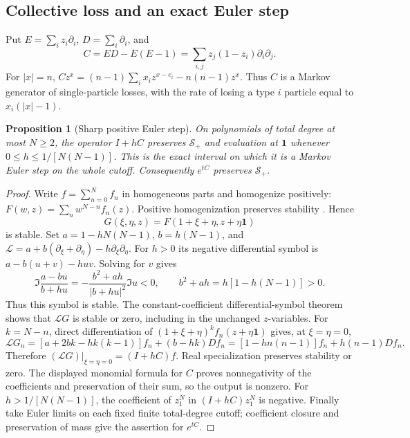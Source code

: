 \documentclass[reqno]{amsart}
\newtheorem{proposition}[theorem]{Proposition}
\theoremstyle{definition}
\theoremstyle{remark}
\begin{document}
\subsection{Collective loss and an exact Euler step}

Put \(E=\sum_i z_i\partial_i\), \(D=\sum_i\partial_i\), and
\begin{equation}\label{pos:coal-operator}
 C=ED-E(E-1)=\sum_{i,j}z_j(1-z_i)\partial_i\partial_j.
\end{equation}
For \(|x|=n\),
\(Cz^x=(n-1)\sum_i x_i z^{x-e_i}-n(n-1)z^x\).
Thus \(C\) is a Markov generator of single-particle losses, with the rate of losing
a type \(i\) particle equal to \(x_i(|x|-1)\).

\begin{proposition}[Sharp positive Euler step]\label{pos:coal}
On polynomials of total degree at most \(N\ge2\), the operator \(I+hC\) preserves
\(\mathcal S_+\) and evaluation at \(\boldsymbol1\) whenever
\(0\le h\le1/[N(N-1)]\).  This is the exact interval on which it is a Markov Euler
step on the whole cutoff.  Consequently \(e^{tC}\) preserves \(\mathcal S_+\).
\end{proposition}
\begin{proof}
Write \(f=\sum_{n=0}^Nf_n\) in homogeneous parts and homogenize positively:
\(F(w,z)=\sum_nw^{N-n}f_n(z)\).  Positive homogenization preserves stability
\cite[Theorem 4.5]{BBL09}.  Hence
\[
 G(\xi,\eta,z)=F(1+\xi+\eta,z+\eta\boldsymbol1)
\]
is stable.  Set \(a=1-hN(N-1)\), \(b=h(N-1)\), and
\(\mathcal L=a+b(\partial_\xi+\partial_\eta)-h\partial_\xi\partial_\eta\).
For \(h>0\) its negative differential symbol is
\(a-b(u+v)-huv\).  Solving for \(v\) gives
\[
 \Im\frac{a-bu}{b+hu}
 =-\frac{b^2+ah}{|b+hu|^2}\Im u<0,
 \qquad b^2+ah=h[1-h(N-1)]>0.
\]
Thus this symbol is stable.  The constant-coefficient differential-symbol theorem
\cite{BB09,BB10} shows that \(\mathcal LG\) is stable or zero, including in the
unchanged \(z\)-variables.
For \(k=N-n\), direct differentiation of
\((1+\xi+\eta)^kf_n(z+\eta\boldsymbol1)\) gives, at \(\xi=\eta=0\),
\[
 \mathcal LG_n=
 [a+2bk-hk(k-1)]f_n+(b-hk)Df_n
 =[1-hn(n-1)]f_n+h(n-1)Df_n.
\]
Therefore \((\mathcal LG)|_{\xi=\eta=0}=(I+hC)f\).  Real specialization preserves
stability or zero.  The displayed monomial formula for \(C\) proves nonnegativity
of the coefficients and preservation of their sum, so the output is nonzero.
For \(h>1/[N(N-1)]\), the coefficient of \(z_1^N\) in \((I+hC)z_1^N\) is negative.
Finally take Euler limits on each fixed finite total-degree cutoff; coefficient
closure and preservation of mass give the assertion for \(e^{tC}\).
\end{proof}
\end{document}
